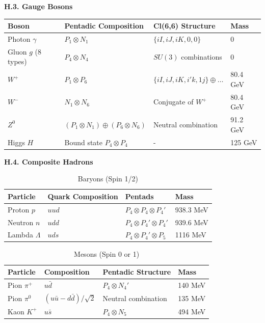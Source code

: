 \documentclass[11pt]{article}
\begin{document}
\textbf{H.3. Gauge Bosons}

\begin{table}[H]
\centering
\begin{tabular}{@{}llll@{}}
\toprule
Boson & Pentadic Composition & Cl(6,6) Structure & Mass \\
\midrule
Photon $\gamma$ & $P_1 \otimes N_1$ & $\{iI, iJ, iK, 0, 0\}$ & 0 \\
Gluon $g$ (8 types) & $P_4 \otimes N_4$ & $SU(3)$ combinations & 0 \\
$W^+$ & $P_1 \otimes P_6$ & $\{iI, iJ, iK, i'k, 1j\} \oplus \dots$ & 80.4 GeV \\
$W^-$ & $N_1 \otimes N_6$ & Conjugate of $W^+$ & 80.4 GeV \\
$Z^0$ & $(P_1 \otimes N_1) \oplus (P_6 \otimes N_6)$ & Neutral combination & 91.2 GeV \\
Higgs $H$ & Bound state $P_4 \otimes P_4$ & - & 125 GeV \\
\bottomrule
\end{tabular}
\end{table}

\textbf{H.4. Composite Hadrons}

\begin{table}[H]
\centering

\begin{tabular}{@{}llll@{}}
\toprule
Particle & Quark Composition & Pentads & Mass \\
\midrule
Proton $p$ & $uud$ & $P_4 \otimes P_4 \otimes P_4'$ & 938.3 MeV \\
Neutron $n$ & $udd$ & $P_4 \otimes P_4' \otimes P_4'$ & 939.6 MeV \\
Lambda $\Lambda$ & $uds$ & $P_4 \otimes P_4' \otimes P_5$ & 1116 MeV \\
\bottomrule
\end{tabular}
\caption{Baryons (Spin 1/2)}
\end{table}

\begin{table}[H]
\centering
\begin{tabular}{@{}llll@{}}
\toprule
Particle & Composition & Pentadic Structure & Mass \\
\midrule
Pion $\pi^+$ & $u\bar{d}$ & $P_4 \otimes N_4'$ & 140 MeV \\
Pion $\pi^0$ & $(u\bar{u} - d\bar{d})/\sqrt{2}$ & Neutral combination & 135 MeV \\
Kaon $K^+$ & $u\bar{s}$ & $P_4 \otimes N_5$ & 494 MeV \\
\bottomrule
\end{tabular}
\caption{Mesons (Spin 0 or 1)}
\end{table}
\end{document}
